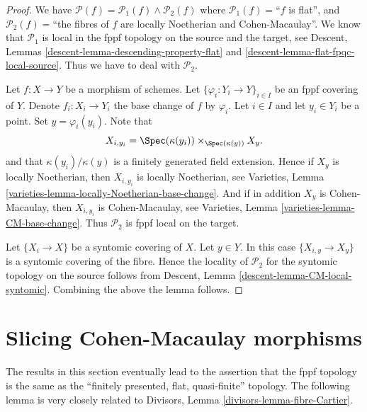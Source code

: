 \begin{proof}
We have
$\mathcal{P}(f) =
\mathcal{P}_1(f) \wedge \mathcal{P}_2(f)$
where
$\mathcal{P}_1(f)=$``$f$ is flat'', and
$\mathcal{P}_2(f)=$``the fibres of $f$ are locally Noetherian
and Cohen-Macaulay''.
We know that $\mathcal{P}_1$ is
local in the fppf topology on the source and the target, see
Descent, Lemmas \ref{descent-lemma-descending-property-flat} and
\ref{descent-lemma-flat-fpqc-local-source}. Thus we have to deal
with $\mathcal{P}_2$.

\medskip\noindent
Let $f : X \to Y$ be a morphism of schemes.
Let $\{\varphi_i : Y_i \to Y\}_{i \in I}$ be an fppf covering of $Y$.
Denote $f_i : X_i \to Y_i$ the base change of $f$ by $\varphi_i$.
Let $i \in I$ and let $y_i \in Y_i$ be a point.
Set $y = \varphi_i(y_i)$. Note that
$$
X_{i, y_i} = \Spec(\kappa(y_i)) \times_{\Spec(\kappa(y))} X_y.
$$
and that $\kappa(y_i)/\kappa(y)$ is a finitely generated field
extension. Hence if $X_y$ is locally Noetherian, then
$X_{i, y_i}$ is locally Noetherian, see
Varieties, Lemma \ref{varieties-lemma-locally-Noetherian-base-change}.
And if in addition $X_y$ is Cohen-Macaulay,
then $X_{i, y_i}$ is Cohen-Macaulay, see
Varieties, Lemma \ref{varieties-lemma-CM-base-change}.
Thus $\mathcal{P}_2$ is fppf local on the target.

\medskip\noindent
Let $\{X_i \to X\}$ be a syntomic covering of $X$.
Let $y \in Y$. In this case $\{X_{i, y} \to X_y\}$ is a
syntomic covering of the fibre. Hence the locality of $\mathcal{P}_2$
for the syntomic topology on the source follows from
Descent, Lemma \ref{descent-lemma-CM-local-syntomic}.
Combining the above the lemma follows.
\end{proof}






\section{Slicing Cohen-Macaulay morphisms}
\label{section-slicing-CM}

\noindent
The results in this section eventually lead to the assertion that
the fppf topology is the same as the
``finitely presented, flat, quasi-finite'' topology.
The following lemma is very closely related to
Divisors, Lemma \ref{divisors-lemma-fibre-Cartier}.

